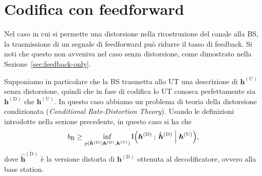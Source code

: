 \section{Codifica con feedforward}

Nel caso in cui si permette una distorsione nella ricostruzione del canale alla
BS, la trasmissione di un segnale di feedforward può ridurre il tasso di
feedback. Si noti che questo non avveniva nel caso senza distorsione, come
dimostrato nella Sezione~\ref{sec:feedback-only}.

Supponiamo in particolare che la BS trasmetta allo UT una descrizione di
\(\bm{h}^\mathrm{(U)}\) senza distorsione, quindi che in fase di codifica lo UT
conosca perfettamente sia \(\bm{h}^\mathrm{(D)}\) che \(\bm{h}^\mathrm{(U)}\).
In questo caso abbiamo un problema di teoria della distorsione condizionata
(\textit{Conditional Rate-Distortion Theory}). Usando le definizioni introdotte
nella sezione precedente, in questo caso si ha \cite{Gray1972ConditionalRT} che
\begin{equation}
    b_\mathrm{B} \ge \inf_{p(
        \hat{\bm{h}}^\mathrm{(D)} \mid \bm{h}^\mathrm{(D)}, \bm{h}^\mathrm{(U)}
    )}
    \mutual{
        \bm{h}^\mathrm{(D)}
    }{
        \hat{\bm{h}}^\mathrm{(D)} \given \bm{h}^\mathrm{(U)}
    } , \label{eq:rate-with-wz-and-feedforward}
\end{equation}
dove \(\hat{\bm{h}}^\mathrm{(D)}\) è la versione distorta di
\(\bm{h}^\mathrm{(D)}\) ottenuta al decodificatore, ovvero alla base station.
